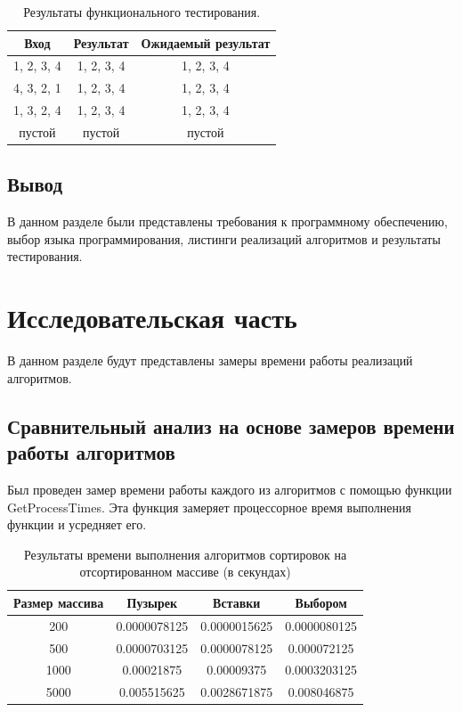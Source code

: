 \documentclass[14pt,russian]{scrartcl}
\begin{document}
\begin{table}[h]
    \caption{\centering Результаты функционального тестирования.}
    \centering
    \begin{tabular}{|c|c|c|}
    \hline
    Вход       & Результат  & Ожидаемый результат \\ \hline
    1, 2, 3, 4 & 1, 2, 3, 4 & 1, 2, 3, 4          \\ \hline
    4, 3, 2, 1 & 1, 2, 3, 4 & 1, 2, 3, 4          \\ \hline
    1, 3, 2, 4 & 1, 2, 3, 4 & 1, 2, 3, 4          \\ \hline
    пустой     & пустой     & пустой              \\ \hline
    \end{tabular}
    \label{tab:tests}
\end{table}


\subsection*{Вывод}

В данном разделе были представлены требования к программному обеспечению, выбор языка программирования, листинги реализаций алгоритмов и результаты тестирования.

\section{Исследовательская часть}

В данном разделе будут представлены замеры времени работы реализаций алгоритмов.

\subsection{Сравнительный анализ на основе замеров времени работы алгоритмов}
	
Был проведен замер времени работы каждого из алгоритмов с помощью функции GetProcessTimes. Эта функция замеряет процессорное время выполнения функции и усредняет его.
\clearpage
    \begin{table}[htb]
        \caption{\centering Результаты времени выполнения алгоритмов сортировок на отсортированном массиве (в секундах)}
        \centering
        \begin{tabular}{|c|c|c|c|}
        \hline
        Размер массива & Пузырек  & Вставки  & Выбором  \\ \hline
        200             & 0.0000078125 & 0.0000015625 & 0.0000080125 \\ \hline
        500            & 0.0000703125 & 0.0000078125 & 0.000072125 \\ \hline
        1000            & 0.00021875 & 0.00009375 & 0.0003203125\\ \hline
        5000           & 0.005515625 & 0.0028671875 & 0.008046875 \\ \hline
        \end{tabular}
        \label{tab:sorted_bench}
    \end{table}
\end{document}
